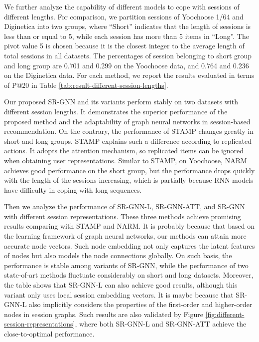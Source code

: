 \documentclass[letterpaper]{article} \usepackage{cite}
\begin{document}
We further analyze the capability of different models to cope with sessions of different lengths. For comparison, we partition sessions of Yoochoose 1/64 and Diginetica into two groups, where ``Short'' indicates that the length of sessions is less than or equal to 5, while each session has more than 5 items in ``Long''. The pivot value 5 is chosen because it is the closest integer to the average length of total sessions in all datasets. The percentages of session belonging to short group and long group are 0.701 and 0.299 on the Yoochoose data, and 0.764 and 0.236 on the Diginetica data. For each method, we report the results evaluated in terms of P@20 in Table \ref{tab:result-different-session-lengths}.

Our proposed SR-GNN and its variants perform stably on two datasets with different session lengths. It demonstrates the superior performance of the proposed method and the adaptability of  graph neural networks in session-based recommendation. On the contrary, the performance of STAMP changes greatly in short and long groups. STAMP \cite{Liu:2018:SSA:3219819.3219950} explains such a difference according to replicated actions. It adopts the attention mechanism, so replicated items can be ignored when obtaining user representations. Similar to STAMP, on Yoochoose, NARM achieves good performance on the short group, but the performance drops quickly with the length of the sessions increasing, which is partially because RNN models have difficulty in coping with long sequences.

Then we analyze the performance of SR-GNN-L, SR-GNN-ATT, and SR-GNN with different session representations. These three methods achieve promising results comparing with STAMP and NARM. It is probably because that based on the learning framework of graph neural networks, our methods can attain more accurate node vectors. Such node embedding not only captures the latent features of nodes but also models the node connections globally. On such basis, the performance is stable among variants of SR-GNN, while the performance of two state-of-art methods fluctuate considerably on short and long datasets. Moreover, the table shows that SR-GNN-L can also achieve good results, although this variant only uses local session embedding vectors. It is maybe because that SR-GNN-L also implicitly considers the properties of the first-order and higher-order nodes in session graphs. Such results are also validated by Figure \ref{fig:different-session-representations}, where both SR-GNN-L and SR-GNN-ATT achieve the close-to-optimal performance.
\end{document}
